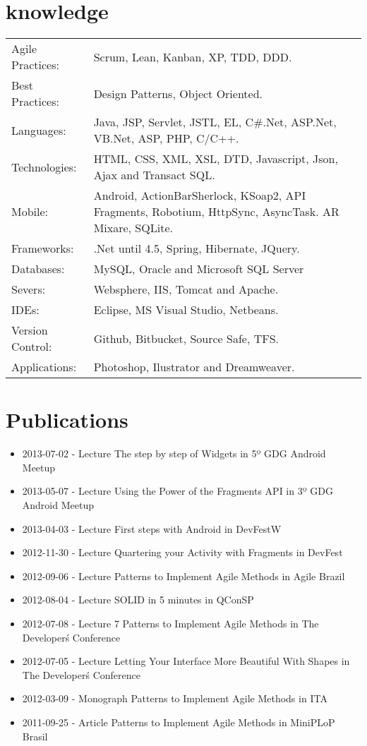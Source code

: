 \documentclass[a4paper, oneside, final]{article}
\begin{document}
\begin{center}
\section{knowledge}

\begin{tabularx}{0.97\linewidth}{p{3.0cm}X}
Agile Practices: & Scrum, Lean, Kanban, XP, TDD, DDD.\\
Best Practices:  & Design Patterns, Object Oriented.\\
Languages:       & Java, JSP, Servlet, JSTL, EL, C\#.Net, ASP.Net, VB.Net, ASP, PHP, C/C++.\\
Technologies:    & HTML, CSS, XML, XSL, DTD, Javascript, Json, Ajax and Transact SQL.\\
Mobile:          & Android, ActionBarSherlock, KSoap2, API Fragments, Robotium, HttpSync, AsyncTask. AR Mixare, SQLite.\\
Frameworks:      & .Net until 4.5, Spring, Hibernate, JQuery.\\
Databases:       & MySQL, Oracle and Microsoft SQL Server \\
Severs:          & Websphere, IIS, Tomcat and Apache.\\
IDEs:            & Eclipse, MS Visual Studio, Netbeans.\\
Version Control: & Github, Bitbucket, Source Safe, TFS.\\
Applications:    & Photoshop, Ilustrator and Dreamweaver.\\
\end{tabularx}

\section{Publications}
\begin{itemize}
	\item 2013-07-02 - Lecture The step by step of Widgets in 5º GDG Android Meetup
	\item 2013-05-07 - Lecture Using the Power of the Fragments API in 3º GDG Android Meetup
	\item 2013-04-03 - Lecture First steps with Android in DevFestW
	\item 2012-11-30 - Lecture Quartering your Activity with Fragments in DevFest
	\item 2012-09-06 - Lecture Patterns to Implement Agile Methods in Agile Brazil
	\item 2012-08-04 - Lecture SOLID in 5 minutes in QConSP
	\item 2012-07-08 - Lecture 7 Patterns to Implement Agile Methods in The Developer\'s Conference
	\item 2012-07-05 - Lecture Letting Your Interface More Beautiful With Shapes in The Developer\'s Conference
	\item 2012-03-09 - Monograph Patterns to Implement Agile Methods in ITA
	\item 2011-09-25 - Article Patterns to Implement Agile Methods in MiniPLoP Brasil
\end{itemize}


\end{center}
\end{document}
